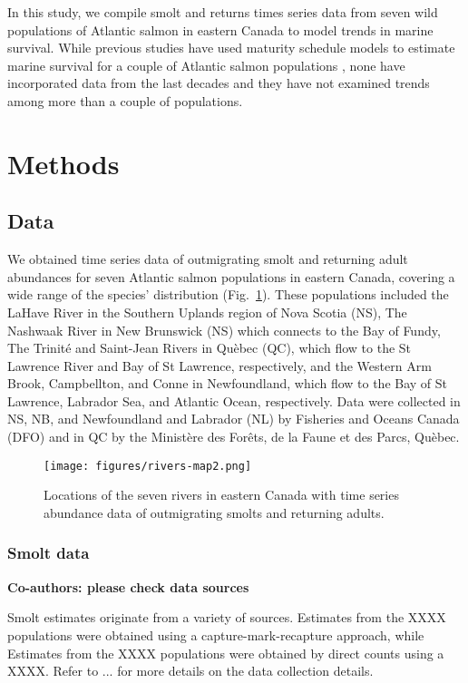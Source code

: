 \documentclass[12pt]{article}
\newcommand{\comment}[1]{\par {\bfseries \color{blue} #1 \par}} %
\begin{document}
In this study, we compile smolt and returns times series data from seven wild
populations of Atlantic salmon in eastern Canada to model trends in marine survival.
While previous studies have used maturity schedule models to estimate marine
survival for a couple of Atlantic salmon populations \citep{Chaput2003b}, none
have incorporated data from the last decades and they have not examined
trends among more than a couple of populations. 

\section*{Methods}

\subsection*{Data}

We obtained time series data of outmigrating smolt and returning adult
abundances for seven Atlantic salmon populations in eastern Canada, covering a
wide range of the species' distribution (Fig.~\ref{fig:map}). These
populations included the LaHave River in the Southern Uplands region of Nova
Scotia (NS), The Nashwaak River in New Brunswick (NS) which connects to the
Bay of Fundy, The Trinit\'{e} and Saint-Jean Rivers in Qu\`{e}bec (QC), which
flow to the St Lawrence River and Bay of St Lawrence, respectively, and the
Western Arm Brook, Campbellton, and Conne in Newfoundland, which flow to the
Bay of St Lawrence, Labrador Sea, and Atlantic Ocean, respectively.
Data were collected in NS, NB, and Newfoundland
and Labrador (NL) by Fisheries and Oceans Canada (DFO) and in QC
by the Minist\`{e}re des For\^{e}ts, de la Faune et des Parcs, Qu\`{e}bec.

\begin{figure}[htbp] \centering
    \texttt{[image: figures/rivers-map2.png]}
    \caption{Locations of the seven rivers in eastern Canada with time series abundance data of outmigrating smolts and 
    returning adults.} \label{fig:map} 
\end{figure}

\subsubsection*{Smolt data}

\comment{Co-authors: please check data sources}

Smolt estimates originate from a variety of sources.
Estimates from the XXXX populations were obtained using a capture-mark-recapture approach, while
Estimates from the XXXX populations were obtained by direct counts using a XXXX.
Refer to ... for more details on the data collection details. 
\end{document}
